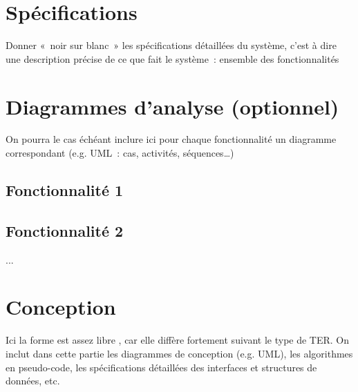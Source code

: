 \documentclass[a4paper,12pt]{article}
\begin{document}
  \begin{titlepage}
   \def\titletype{Analyse et conception}
   
  \end{titlepage}

  
  \clearpage

  \tableofcontents
  

  \clearpage
  
  \renewcommand{\labelitemi}{$\bullet$}
  \renewcommand{\labelitemii}{$\circ$}
  \renewcommand{\labelitemiii}{$\diamond$}
  \renewcommand{\labelitemiv}{$\ast$}
  
  \section{Spécifications}
  Donner « noir sur blanc » les spécifications détaillées du système, 
  c’est à dire une description précise de ce que fait le système : ensemble des fonctionnalités

 
 
 
 \section{Diagrammes d’analyse (optionnel)}
  On pourra le cas échéant inclure ici pour chaque fonctionnalité un diagramme correspondant 
  (e.g. UML : cas, activités, séquences…)
    \subsection{Fonctionnalité 1}
    \subsection{Fonctionnalité 2}
    ...
  
  
  
  \section{Conception}
  Ici la forme est assez libre , car elle diffère fortement suivant le type de TER.
  On inclut dans cette partie les diagrammes de conception (e.g. UML), les algorithmes 
  en pseudo-code, les spécifications détaillées des interfaces et structures de données, etc.
  
  



\end{document}
